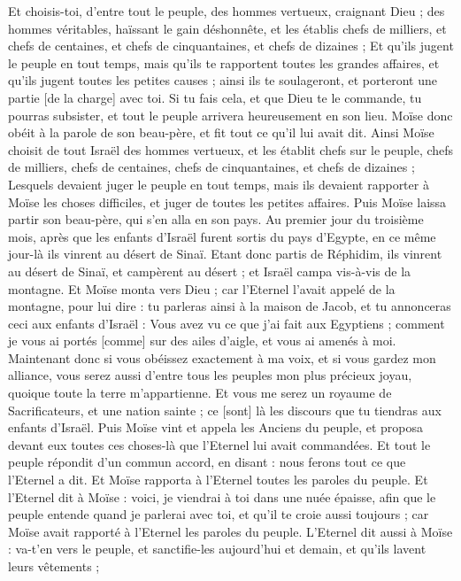 \begin{multicols}{2}
Et choisis-toi, d'entre tout le peuple, des hommes vertueux, craignant Dieu ; des hommes véritables, haïssant le gain déshonnête, et les établis chefs de milliers, et chefs de centaines, et chefs de cinquantaines, et chefs de dizaines ;
Et qu'ils jugent le peuple en tout temps, mais qu'ils te rapportent toutes les grandes affaires, et qu'ils jugent toutes les petites causes ; ainsi ils te soulageront, et porteront une partie [de la charge] avec toi.
Si tu fais cela, et que Dieu te le commande, tu pourras subsister, et tout le peuple arrivera heureusement en son lieu.
Moïse donc obéit à la parole de son beau-père, et fit tout ce qu'il lui avait dit.
Ainsi Moïse choisit de tout Israël des hommes vertueux, et les établit chefs sur le peuple, chefs de milliers, chefs de centaines, chefs de cinquantaines, et chefs de dizaines ;
Lesquels devaient juger le peuple en tout temps, mais ils devaient rapporter à Moïse les choses difficiles, et juger de toutes les petites affaires.
Puis Moïse laissa partir son beau-père, qui s'en alla en son pays.
\VerseOne{}Au premier jour du troisième mois, après que les enfants d'Israël furent sortis du pays d'Egypte, en ce même jour-là ils vinrent au désert de Sinaï.
Etant donc partis de Réphidim, ils vinrent au désert de Sinaï, et campèrent au désert ; et Israël campa vis-à-vis de la montagne.
Et Moïse monta vers Dieu ; car l'Eternel l'avait appelé de la montagne, pour lui dire : tu parleras ainsi à la maison de Jacob, et tu annonceras ceci aux enfants d'Israël :
Vous avez vu ce que j'ai fait aux Egyptiens ; comment je vous ai portés [comme] sur des ailes d'aigle, et vous ai amenés à moi.
Maintenant donc si vous obéissez exactement à ma voix, et si vous gardez mon alliance, vous serez aussi d'entre tous les peuples mon plus précieux joyau, quoique toute la terre m'appartienne.
Et vous me serez un royaume de Sacrificateurs, et une nation sainte ; ce [sont] là les discours que tu tiendras aux enfants d'Israël.
Puis Moïse vint et appela les Anciens du peuple, et proposa devant eux toutes ces choses-là que l'Eternel lui avait commandées.
Et tout le peuple répondit d'un commun accord, en disant : nous ferons tout ce que l'Eternel a dit. Et Moïse rapporta à l'Eternel toutes les paroles du peuple.
Et l'Eternel dit à Moïse : voici, je viendrai à toi dans une nuée épaisse, afin que le peuple entende quand je parlerai avec toi, et qu'il te croie aussi toujours ; car Moïse avait rapporté à l'Eternel les paroles du peuple.
L'Eternel dit aussi à Moïse : va-t'en vers le peuple, et sanctifie-les aujourd'hui et demain, et qu'ils lavent leurs vêtements ;

\end{multicols}
